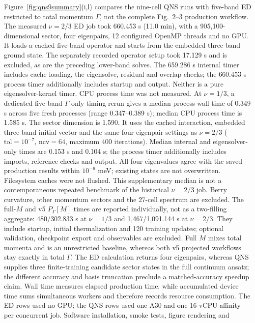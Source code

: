 Figure~\ref{fig:qns9summary}(i,l) compares the nine-cell QNS runs with
five-band ED restricted to total momentum $\Gamma$, not the complete
Fig.~2--3 production workflow. The measured $\nu=2/3$ ED job took
660.453 s (11.0 min), with a 905,100-dimensional sector, four eigenpairs,
12 configured OpenMP threads and no GPU. It loads a cached five-band
operator and starts from the embedded three-band ground state.
The separately recorded operator setup took 17.129 s and is excluded,
as are the preceding lower-band solves. The 659.286 s internal timer
includes cache loading, the eigensolve, residual and overlap checks;
the 660.453 s process timer additionally includes startup and output.
Neither is a pure eigensolver-kernel timer. CPU process time was not measured.
At $\nu=1/3$, a dedicated five-band $\Gamma$-only timing rerun gives a
median process wall time of 0.349 s across five fresh processes
(range 0.347--0.389 s); median CPU process time is 1.585 s.
The sector dimension is 1,590. It uses the cached interaction, embedded
three-band initial vector and the same four-eigenpair settings as $\nu=2/3$
($\mathrm{tol}=10^{-7}$, $\mathrm{ncv}=64$, maximum 400 iterations).
Median internal and eigensolver-only times are 0.153 s and 0.104 s;
the process timer additionally includes imports, reference checks and output.
All four eigenvalues agree with the saved production results within
$10^{-6}$ meV; existing states are not overwritten. Filesystem caches were
not flushed. This supplementary median is not a contemporaneous repeated
benchmark of the historical $\nu=2/3$ job.
Berry curvature, other momentum sectors and the 27-cell spectrum are excluded.
The full-$M$ and v5 $P_\Gamma[M]$ times are reported individually, not as a
two-filling aggregate: 480/302.833 s at $\nu=1/3$ and
1,467/1,091.144 s at $\nu=2/3$.
They include startup, initial thermalization and 120 training updates;
optional validation, checkpoint export and observables are excluded.
Full $M$ mixes total momenta and is an unrestricted baseline, whereas both
v5 projected workflows stay exactly in total $\Gamma$.
The ED calculation returns four eigenpairs, whereas QNS supplies three
finite-training candidate sector states in the full continuum ansatz; the
different accuracy and basis truncation preclude a matched-accuracy speedup claim.
Wall time measures elapsed production time, while accumulated device time
sums simultaneous workers and therefore records resource consumption.  The
ED rows used no GPU; the QNS rows used one A30 and one 16-vCPU affinity per
concurrent job. Software installation, smoke tests, figure rendering and
